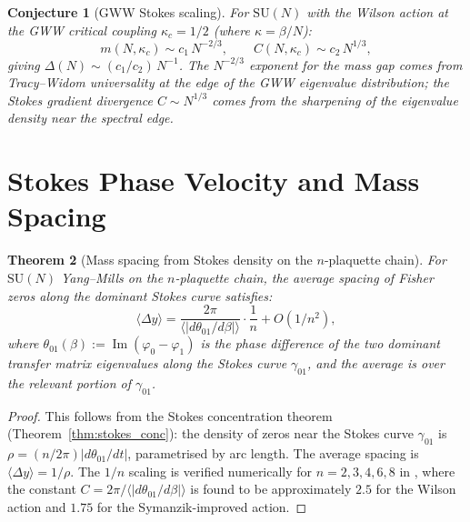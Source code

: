 \documentclass[12pt]{article}
\newtheorem{theorem}{Theorem}[section]
\newtheorem{conjecture}[theorem]{Conjecture}
\theoremstyle{definition}
\theoremstyle{remark}
\newcommand{\SU}{\mathrm{SU}}
\newcommand{\im}{\operatorname{Im}}
\begin{document}
\begin{conjecture}[GWW Stokes scaling]
\label{conj:gww_stokes}
For $\SU(N)$ with the Wilson action at the GWW critical coupling
$\kappa_c = 1/2$ (where $\kappa = \beta/N$):
\begin{equation}
m(N, \kappa_c) \sim c_1\,N^{-2/3}, \qquad
C(N, \kappa_c) \sim c_2\,N^{1/3},
\end{equation}
giving $\Delta(N) \sim (c_1/c_2)\,N^{-1}$.  The $N^{-2/3}$
exponent for the mass gap comes from Tracy--Widom universality at the
edge of the GWW eigenvalue distribution; the Stokes gradient
divergence $C \sim N^{1/3}$ comes from the sharpening of the
eigenvalue density near the spectral edge.
\end{conjecture}

\section{Stokes Phase Velocity and Mass Spacing}
\label{sec:prediction}

\begin{theorem}[Mass spacing from Stokes density on the
$n$-plaquette chain]
\label{thm:glueball_spacing}
For $\SU(N)$ Yang--Mills on the $n$-plaquette chain, the average
spacing of Fisher zeros along the dominant Stokes curve satisfies:
\begin{equation}\label{eq:glueball_delta}
\langle \Delta y \rangle =
\frac{2\pi}{\langle |d\theta_{01}/d\beta| \rangle}
\cdot \frac{1}{n} + O(1/n^2),
\end{equation}
where $\theta_{01}(\beta) := \im(\varphi_0 - \varphi_1)$ is the
phase difference of the two dominant transfer matrix eigenvalues
along the Stokes curve $\gamma_{01}$, and the average is over
the relevant portion of $\gamma_{01}$.
\end{theorem}

\begin{proof}
This follows from the Stokes concentration theorem
(Theorem~\ref{thm:stokes_conc}): the density of zeros near the
Stokes curve $\gamma_{01}$ is
$\rho = (n/2\pi)|d\theta_{01}/dt|$, parametrised by arc length.
The average spacing is $\langle \Delta y \rangle = 1/\rho$.
The $1/n$ scaling is verified
numerically for $n = 2, 3, 4, 6, 8$ in \cite{OlbrykPsi2026}, where
the constant $C = 2\pi/\langle |d\theta_{01}/d\beta| \rangle$ is
found to be approximately $2.5$ for the Wilson action and $1.75$ for
the Symanzik-improved action.
\end{proof}
\end{document}
